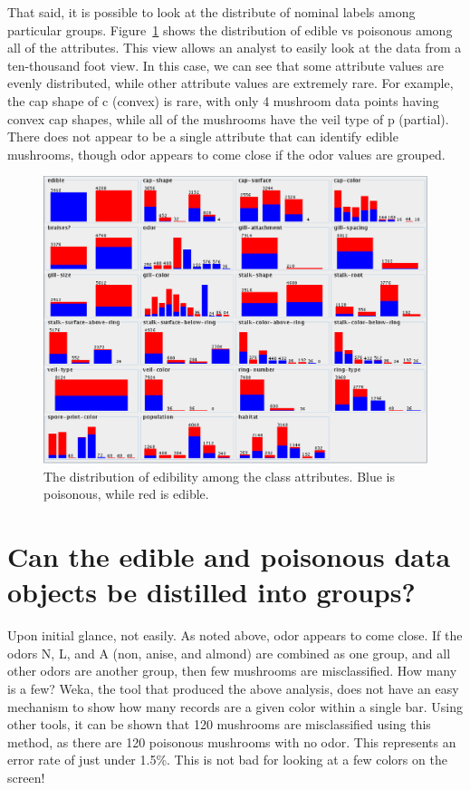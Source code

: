 \documentclass[margin,letterpaper,11pt]{scrartcl}
\newlength \figwidth
\begin{document}
That said, it is possible to look at the distribute of nominal labels among
particular groups. Figure~\ref{fig:summary_stat} shows the distribution of edible
vs poisonous among all of the attributes. This view allows an analyst to
easily look at the data from a ten-thousand foot view. In this case, we can
see that some attribute values are evenly distributed, while other attribute
values are extremely rare. For example, the cap shape of c (convex) is rare,
with only 4 mushroom data points having convex cap shapes, while all of the
mushrooms have the veil type of p (partial). There does not appear to be a
single attribute that can identify edible mushrooms, though odor appears to
come close if the odor values are grouped.

\begin{figure}[!htb]
\begin{center}
   \includegraphics[width=\figwidth]{images/summary.eps}
   \caption{The distribution of edibility among the class attributes. Blue is
   poisonous, while red is edible.}
   \label{fig:summary_stat}
\end{center}
\end{figure}

\section{Can the edible and poisonous data objects be distilled into groups?}

Upon initial glance, not easily. As noted above, odor appears to come close.
If the odors N, L, and A (non, anise, and almond) are combined as one group,
and all other odors are another group, then few mushrooms are misclassified.
How many is a few? Weka, the tool that produced the above analysis, does not
have an easy mechanism to show how many records are a given color within a
single bar. Using other tools, it can be shown that 120 mushrooms are
misclassified using this method, as there are 120 poisonous mushrooms with no
odor. This represents an error rate of just under 1.5\%. This is not bad for
looking at a few colors on the screen!
\end{document}
